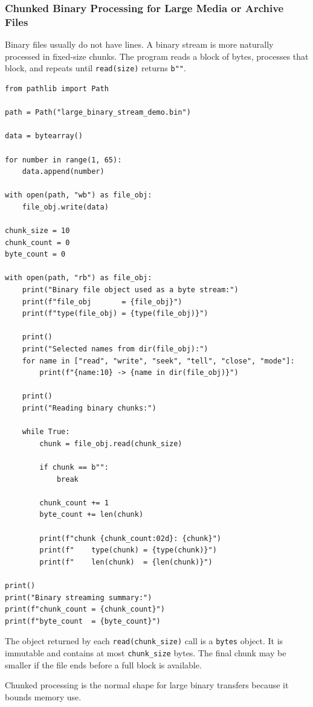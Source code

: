 \subsubsection{Chunked Binary Processing for Large Media or Archive Files}

Binary files usually do not have lines. A binary stream is more naturally processed in fixed-size chunks. The program reads a block of bytes, processes that block, and repeats until \texttt{read(size)} returns \texttt{b""}.

\begin{verbatim}
from pathlib import Path

path = Path("large_binary_stream_demo.bin")

data = bytearray()

for number in range(1, 65):
    data.append(number)

with open(path, "wb") as file_obj:
    file_obj.write(data)

chunk_size = 10
chunk_count = 0
byte_count = 0

with open(path, "rb") as file_obj:
    print("Binary file object used as a byte stream:")
    print(f"file_obj       = {file_obj}")
    print(f"type(file_obj) = {type(file_obj)}")

    print()
    print("Selected names from dir(file_obj):")
    for name in ["read", "write", "seek", "tell", "close", "mode"]:
        print(f"{name:10} -> {name in dir(file_obj)}")

    print()
    print("Reading binary chunks:")

    while True:
        chunk = file_obj.read(chunk_size)

        if chunk == b"":
            break

        chunk_count += 1
        byte_count += len(chunk)

        print(f"chunk {chunk_count:02d}: {chunk}")
        print(f"    type(chunk) = {type(chunk)}")
        print(f"    len(chunk)  = {len(chunk)}")

print()
print("Binary streaming summary:")
print(f"chunk_count = {chunk_count}")
print(f"byte_count  = {byte_count}")
\end{verbatim}

The object returned by each \texttt{read(chunk\_size)} call is a \texttt{bytes} object. It is immutable and contains at most \texttt{chunk\_size} bytes. The final chunk may be smaller if the file ends before a full block is available.

Chunked processing is the normal shape for large binary transfers because it bounds memory use.

